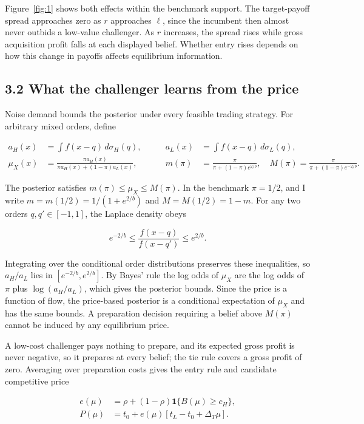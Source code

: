 Figure~\ref{fig:1} shows both effects within the benchmark support. The
target-payoff spread approaches zero as \(r\) approaches \(\ell\), since
the incumbent then almost never outbids a low-value challenger. As \(r\)
increases, the spread rises while gross acquisition profit falls at each
displayed belief. Whether entry rises depends on how this change in
payoffs affects equilibrium information.

\subsection{3.2 What the challenger learns from the
price}\label{sec-inference}

Noise demand bounds the posterior under every feasible trading strategy.
For arbitrary mixed orders, define

\[
\begin{aligned}
a_H(x)&=\int f(x-q)\,d\sigma_H(q),\qquad
&a_L(x)&=\int f(x-q)\,d\sigma_L(q),\\
\mu_X(x)&=\frac{\pi a_H(x)}{\pi a_H(x)+(1-\pi)a_L(x)},\qquad
&m(\pi)&=\frac{\pi}{\pi+(1-\pi)e^{2/b}},\quad
M(\pi)=\frac{\pi}{\pi+(1-\pi)e^{-2/b}}.
\end{aligned}
\tag{7}\label{eq:paper-7}
\]

The posterior satisfies \(m(\pi)\le\mu_X\le M(\pi)\). In the benchmark
\(\pi=1/2\), and I write \(m=m(1/2)=1/(1+e^{2/b})\) and
\(M=M(1/2)=1-m\). For any two orders \(q,q'\in[-1,1]\), the Laplace
density obeys

\[
e^{-2/b}\le\frac{f(x-q)}{f(x-q')}\le e^{2/b}.
\tag{8}\label{eq:paper-8}
\]

Integrating over the conditional order distributions preserves these
inequalities, so \(a_H/a_L\) lies in \([e^{-2/b},e^{2/b}]\). By Bayes'
rule the log odds of \(\mu_X\) are the log odds of \(\pi\) plus
\(\log(a_H/a_L)\), which gives the posterior bounds. Since the price is
a function of flow, the price-based posterior is a conditional
expectation of \(\mu_X\) and has the same bounds. A preparation decision
requiring a belief above \(M(\pi)\) cannot be induced by any equilibrium
price.

A low-cost challenger pays nothing to prepare, and its expected gross
profit is never negative, so it prepares at every belief; the tie rule
covers a gross profit of zero. Averaging over preparation costs gives
the entry rule and candidate competitive price

\[
\begin{aligned}
e(\mu)&=\rho+(1-\rho)\mathbf1\{B(\mu)\ge c_H\},\\
P(\mu)&=t_0+e(\mu)[t_L-t_0+\Delta_T\mu].
\end{aligned}
\tag{9}\label{eq:paper-9}
\]


